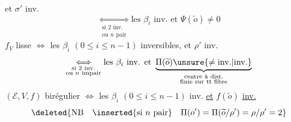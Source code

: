 et $\sigma'$ inv.
\[
\underset{\substack{\text{si }2\text{ inv.}\\\text{ou }n\text{ pair}}}{\Longleftrightarrow}
\text{les }\beta_i\text{ inv. et }\Psi(\widetilde o)\neq0
\]
$f_V$ lisse
$\Longleftrightarrow$ les $\beta_i$ $(0\leq i\leq n-1)$ inversibles,
et $\rho'$ inv.
\[
\underset{\substack{\text{si }2\text{ inv.}\\\text{ou }n\text{ impair}}}{\Longleftrightarrow}
\text{les }\beta_i\text{ inv. et }
\underbrace{\Pi(\widetilde o)\unsure{\neq\text{inv.}|\text{inv.}}}_{
\substack{\text{centre à dist.}\\\text{finie sur tt fibre}}}
\]
$(\mathcal E,V,f)$ birégulier
$\Longleftrightarrow$ les $\beta_i$ $(0\leq i\leq n-1)$ inv.
\uline{et} $f(\widetilde o)$ \uline{inv.}
\[
\deleted{\text{NB}\quad\inserted{\text{si }n\text{ pair}}\quad
\Pi(o')=\Pi(\widetilde o/\rho')=\rho/\rho'=2}
\]

